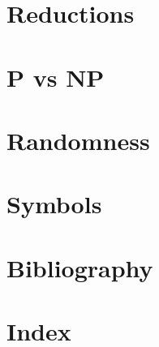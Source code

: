 \documentclass{book}
\begin{document}
\chapter{Reductions}



\chapter{P vs NP}



\chapter{Randomness}



\appendix
\chapter{Symbols}


\backmatter

\chapter{Bibliography}


\chapter{Index}

\end{document}
